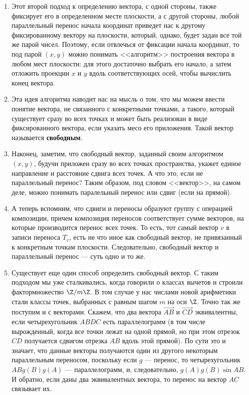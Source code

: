 \begin{enumerate}
\item Этот второй подход к определению вектора, с одной стороны, также фиксирует его в определенном месте плоскости, а с другой стороны, любой параллельный перенос начала координат приведет нас к другому фиксированному вектору на плоскости, который, однако, будет задан все той же парой чисел. Поэтому, если отвлечься от фиксации начала координат, то под парой $(x,y)$ можно понимать <<алгоритм>> построения вектора в любом мест плоскости: для этого достаточно выбрать его начало, а затем отложить проекции $x$ и $y$ вдоль соответствующих осей, чтобы вычислить конец вектора.
\item Эта идея алгоритма наводит нас на мысль о том, что мы можем ввести понятие вектора, не связанного с конкретными точками, а такого, который существует сразу во всех точках и может быть реализован в виде фиксированного вектора, если указать месо его приложения. Такой вектор называется \textbf{свободным}.
\item Наконец, заметим, что свободный вектор, заданный своим алгоритмом $(x,y)$, будучи приложен сразу во всех точках пространства, укажет единое направление и расстояние сдвига всех точек. А что это, если не параллельный перенос? Таким образом, под словом <<вектор>>, на самом деле, можно понимать паралельный перенос или сдвиг (если на прямой).
\item А теперь вспомним, что сдвиги и переносы образуют группу с операцией композиции, причем композиция переносов соответствует сумме векторов, на которые производится перенос всех точек. То есть, тот самый вектор $v$ в записи переноса $T_v$, есть не что иное как свободный вектор, не привязанный к конкретным точкам плоскости. Следовательно, свободный вектор и параллельный перенос --- суть одно и то же.
\item Существует еще один способ определить свободный вектор. С таким подходом мы уже сталкивались, когда говорили о классах вычетов и строили фактормножество $\Z/m\Z$. В том случае у нас числами новой арифметики стали классы точек, выбранных с равным шагом $m$ на оси $\Z$. Точно так же поступим и с векторами. Скажем, что два вектора $\vec{AB}$ и $\vec{CD}$ эквивалентны, если четырехугольник $ABDC$ есть параллелограмм (в том числе вырожденный, когда все точки лежат на одной прямой, но при этом отрезок $CD$ получается сдвигом отрезка $AB$ вдоль этой прямой). По сути это и значает, что данные векторы получаются один из другого некоторым параллельным переносом, поскольку если $g$ --- перенос, то четырехугольник $ABg(B)g(A)$ --- параллелограмм, и, следовательно, $g(A)g(B)\sin AB$. И обратно, если даны два эквивалентных вектора, то перенос на вектор $AC$ связывает их.

\end{enumerate}
